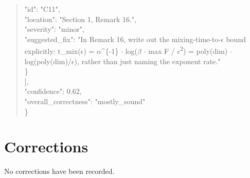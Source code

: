 \documentclass[11pt]{article}
\begin{document}
\begin{quote}
      "id": "C11",\\
      "location": "Section 1, Remark 16.",\\
      "severity": "minor",\\
      "suggested\_fix": "In Remark 16, write out the mixing-time-to-\ensuremath{\epsilon} bound explicitly: t\_mix(\ensuremath{\epsilon}) = \ensuremath{\alpha}\^{}\{-1\} \ensuremath{\cdot} log(\ensuremath{\beta} \ensuremath{\cdot} max F / \ensuremath{\epsilon}\textsuperscript{2}) = poly(dim) \ensuremath{\cdot} log(poly(dim)/\ensuremath{\epsilon}), rather than just naming the exponent rate."\\
    \}\\
  ],\\
  "confidence": 0.62,\\
  "overall\_correctness": "mostly\_sound"\\
\}\\
\end{quote}

\section*{Corrections}
No corrections have been recorded.
\end{document}
